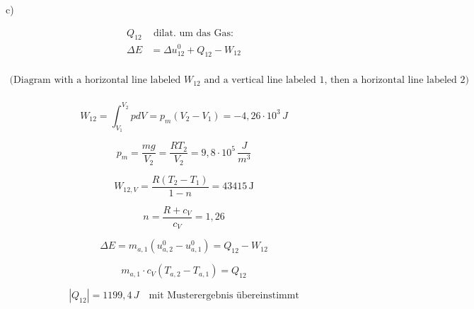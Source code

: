 c)

\begin{align*}
Q_{12} & \text{ dilat. um das Gas:} \\
\Delta E &= \Delta u_{12}^0 + Q_{12} - W_{12} \\
\end{align*}

\[
\begin{array}{c}
\text{(Diagram with a horizontal line labeled } W_{12} \text{ and a vertical line labeled } 1 \text{, then a horizontal line labeled } 2 \text{)} \\
\end{array}
\]

\[
W_{12} = \int_{V_1}^{V_2} p dV = p_{m} (V_2 - V_1) = -4,26 \cdot 10^3 \, J
\]

\[
p_{m} = \frac{m g}{V_2} = \frac{R T_2}{V_2} = 9,8 \cdot 10^5 \, \frac{J}{m^3}
\]

\[
W_{12, V} = \frac{R (T_2 - T_1)}{1 - n} = 43415 \, \text{J}
\]

\[
n = \frac{R + c_V}{c_V} = 1,26
\]

\[
\Delta E = m_{a,1} (u_{a,2}^0 - u_{a,1}^0) = Q_{12} - W_{12}
\]

\[
m_{a,1} \cdot c_V (T_{a,2} - T_{a,1}) = Q_{12}
\]

\[
|Q_{12}| = 1199,4 \, J \quad \text{mit Musterergebnis übereinstimmt}
\]